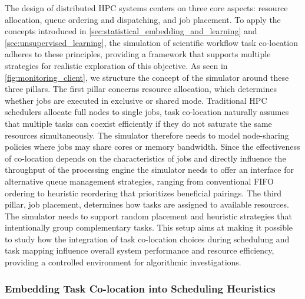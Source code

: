 The design of distributed HPC systems centers on three core aspects: resource allocation, queue ordering and dispatching, and job placement. To apply the concepts introduced in \ref{sec:statistical_embedding_and_learning} and \ref{sec:unsupervised_learning}, the simulation of scientific workflow task co-location adheres to these principles, providing a framework that supports multiple strategies for realistic exploration of this objective.
As seen in \ref{fig:monitoring_client}, we structure the concept of the simulator around these three pillars.
The first pillar concerns resource allocation, which determines whether jobs are executed in exclusive or shared mode. Traditional HPC schedulers allocate full nodes to single jobs, task co-location naturally assumes that multiple tasks can coexist efficiently if they do not saturate the same resources simultaneously. The simulator therefore needs to model node-sharing policies where jobs may share cores or memory bandwidth.
Since the effectiveness of co-location depends on the characteristics of jobs and directly influence the throughput of the processing engine the simulator needs to offer an interface for alternative queue management strategies, ranging from conventional FIFO ordering to heuristic reordering that prioritizes beneficial pairings.
The third pillar, job placement, determines how tasks are assigned to available resources. The simulator needs to support random placement and heuristic strategies that intentionally group complementary tasks.
This setup aims at making it possible to study how the integration of task co-location choices during schedulung and task mapping influence overall system performance and resource efficiency, providing a controlled environment for algorithmic investigations.

\subsubsection{Embedding Task Co-location into Scheduling Heuristics}
\label{sec:heuristic_design}

